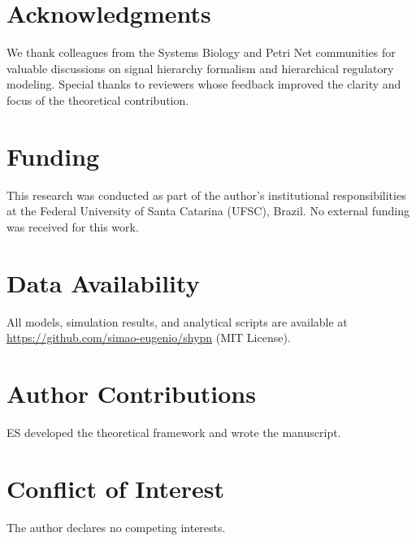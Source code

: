 
\section*{Acknowledgments}

\vspace{3pt}
\noindent We thank colleagues from the Systems Biology and Petri Net communities for valuable discussions on signal hierarchy formalism and hierarchical regulatory modeling. Special thanks to reviewers whose feedback improved the clarity and focus of the theoretical contribution.

\section*{Funding}

\vspace{3pt}
\noindent This research was conducted as part of the author's institutional responsibilities at the Federal University of Santa Catarina (UFSC), Brazil. No external funding was received for this work.

\section*{Data Availability}

\vspace{3pt}
\noindent All models, simulation results, and analytical scripts are available at \url{https://github.com/simao-eugenio/shypn} (MIT License).

\section*{Author Contributions}

\vspace{3pt}
\noindent ES developed the theoretical framework and wrote the manuscript.

\section*{Conflict of Interest}

\vspace{3pt}
\noindent The author declares no competing interests.

